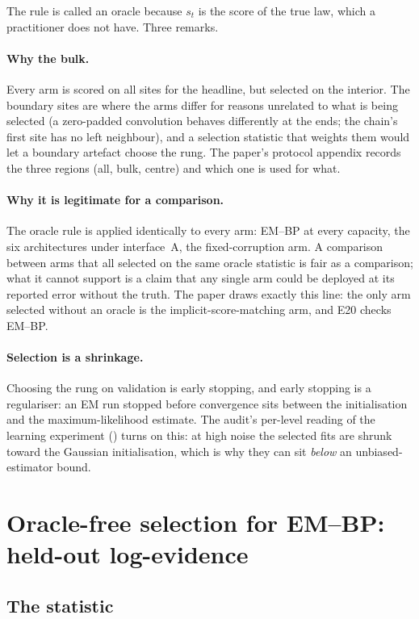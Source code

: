 The rule is called an oracle because $s_t$ is the score of the true law, which a
practitioner does not have. Three remarks.

\paragraph{Why the bulk.} Every arm is scored on all sites for the headline, but
selected on the interior. The boundary sites are where the arms differ for reasons
unrelated to what is being selected (a zero-padded convolution behaves differently at
the ends; the chain's first site has no left neighbour), and a selection statistic that
weights them would let a boundary artefact choose the rung. The paper's protocol
appendix records the three regions (all, bulk, centre) and which one is used for what.

\paragraph{Why it is legitimate for a comparison.} The oracle rule is applied
identically to every arm: EM--BP at every capacity, the six architectures under
interface~A, the fixed-corruption arm. A comparison between arms that all selected on
the same oracle statistic is fair as a comparison; what it cannot support is a claim
that any single arm could be deployed at its reported error without the truth. The
paper draws exactly this line: the only arm selected without an oracle is the
implicit-score-matching arm, and E20 checks EM--BP.

\paragraph{Selection is a shrinkage.} Choosing the rung on validation is early
stopping, and early stopping is a regulariser: an EM run stopped before convergence
sits between the initialisation and the maximum-likelihood estimate. The audit's
per-level reading of the learning experiment () turns on this:
at high noise the selected fits are shrunk toward the Gaussian initialisation, which is
why they can sit \emph{below} an unbiased-estimator bound.

\section{Oracle-free selection for EM--BP: held-out log-evidence}
\label{sec:evidence-selection}

\subsection{The statistic}

